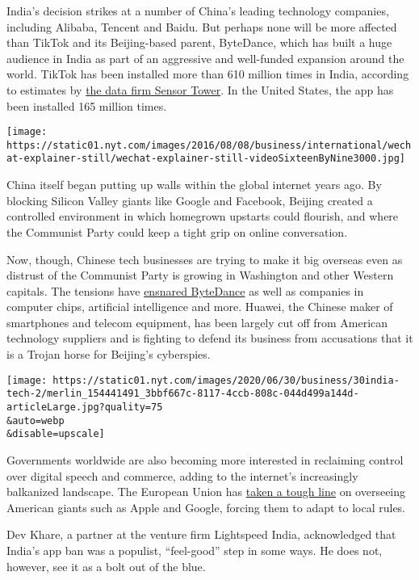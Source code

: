 India's decision strikes at a number of China's leading technology
companies, including Alibaba, Tencent and Baidu. But perhaps none will
be more affected than TikTok and its Beijing-based parent, ByteDance,
which has built a huge audience in India as part of an aggressive and
well-funded expansion around the world. TikTok has been installed more
than 610 million times in India, according to estimates by
\href{https://sensortower.com/blog/tiktok-downloads-2-billion}{the data
firm Sensor Tower}. In the United States, the app has been installed 165
million times.

\texttt{[image: https://static01.nyt.com/images/2016/08/08/business/international/wechat-explainer-still/wechat-explainer-still-videoSixteenByNine3000.jpg]}

China itself began putting up walls within the global internet years
ago. By blocking Silicon Valley giants like Google and Facebook, Beijing
created a controlled environment in which homegrown upstarts could
flourish, and where the Communist Party could keep a tight grip on
online conversation.

Now, though, Chinese tech businesses are trying to make it big overseas
even as distrust of the Communist Party is growing in Washington and
other Western capitals. The tensions have
\href{https://www.nytimes.com/2019/11/18/technology/tiktok-alex-zhu-interview.html}{ensnared
ByteDance} as well as companies in computer chips, artificial
intelligence and more. Huawei, the Chinese maker of smartphones and
telecom equipment, has been largely cut off from American technology
suppliers and is fighting to defend its business from accusations that
it is a Trojan horse for Beijing's cyberspies.

\texttt{[image: https://static01.nyt.com/images/2020/06/30/business/30india-tech-2/merlin\_154441491\_3bbf667c-8117-4ccb-808c-044d499a144d-articleLarge.jpg?quality=75\\\&auto=webp\\\&disable=upscale]}

Governments worldwide are also becoming more interested in reclaiming
control over digital speech and commerce, adding to the internet's
increasingly balkanized landscape. The European Union has
\href{https://www.nytimes.com/2019/11/19/technology/tech-regulator-europe.html}{taken
a tough line} on overseeing American giants such as Apple and Google,
forcing them to adapt to local rules.

Dev Khare, a partner at the venture firm Lightspeed India, acknowledged
that India's app ban was a populist, ``feel-good'' step in some ways. He
does not, however, see it as a bolt out of the blue.

